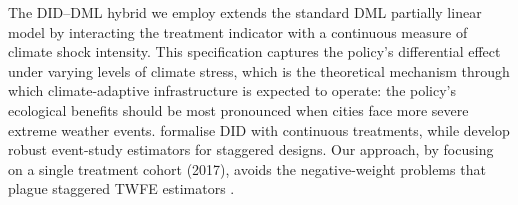 The DID--DML hybrid we employ extends the standard DML partially linear
model by interacting the treatment indicator with a continuous measure
of climate shock intensity. This specification captures the policy's
differential effect under varying levels of climate stress, which is
the theoretical mechanism through which climate-adaptive infrastructure
is expected to operate: the policy's ecological benefits should be most
pronounced when cities face more severe extreme weather events.
\citet{callaway2024did} formalise DID with continuous treatments, while
\citet{borusyak2024revisiting} develop robust event-study estimators
for staggered designs. Our approach, by focusing on a single treatment
cohort (2017), avoids the negative-weight problems that plague staggered
TWFE estimators \citep{chaisemartin2023twoway,roth2024interpreting}.
